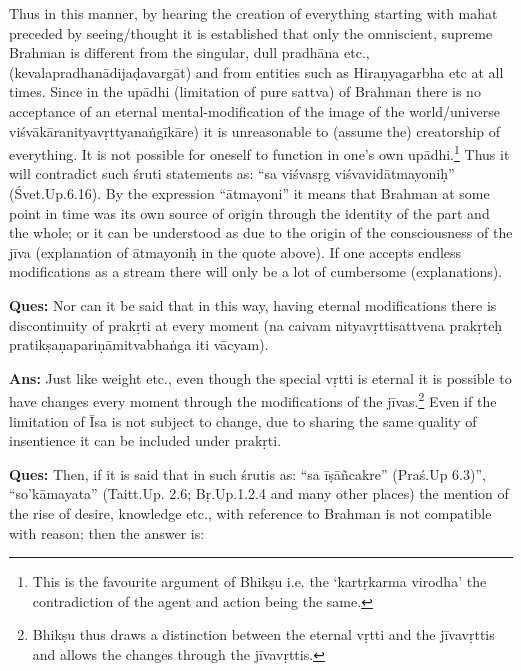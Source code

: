 Thus in this manner, by hearing the creation of everything starting with mahat preceded by seeing/thought it is established that only the omniscient, supreme Brahman is different from the singular, dull pradhāna etc., (kevalapradhanādijaḍavargāt) and from entities such as Hiraṇyagarbha etc at all times. Since in the upādhi (limitation of pure sattva) of Brahman there is no acceptance of an eternal mental-modification of the image of the world/universe viśvākāranityavṛttyanaṅgīkāre) it is unreasonable to (assume the) creatorship of everything. It is not possible for oneself to function in one’s own upādhi.\footnote{This is the favourite argument of Bhikṣu i.e. the ‘kartṛkarma virodha’ the contradiction of the agent and action being the same.} Thus it will contradict such śruti statements as: “sa viśvasṛg viśvavidātmayoniḥ” (Śvet.Up.6.16). By the expression “ātmayoni” it means that Brahman at some point in time was its own source of origin through the identity of the part and the whole; or it can be understood as due to the origin of the consciousness of the jīva (explanation of ātmayoniḥ in the quote above). If one accepts endless modifications as a stream there will only be a lot of cumbersome (explanations).

\textbf{Ques:} Nor can it be said that in this way, having eternal modifications there is discontinuity of prakṛti at every moment (na caivam nityavṛttisattvena prakṛteḥ pratikṣaṇapariṇāmitvabhaṅga iti vācyam). 

\textbf{Ans:} Just like weight etc., even though the special vṛtti is eternal it is possible to have changes every moment through the modifications of the jīvas.\footnote{Bhikṣu thus draws a distinction between the eternal vṛtti and the jīvavṛttis and allows the changes through the jīvavṛttis.} Even if the limitation of Īsa is not subject to change, due to sharing the same quality of insentience it can be included under prakṛti. 

\textbf{Ques:} Then, if it is said that in such śrutis as: “sa īṣāñcakre” (Praś.Up 6.3)”,  “so’kāmayata” (Taitt.Up. 2.6; Bṛ.Up.1.2.4 and many other places) the mention of the rise of desire, knowledge etc., with reference to Brahman is not compatible with reason; then the answer is: 

